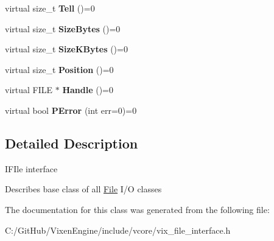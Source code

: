 \begin{DoxyCompactItemize}
\item 
\hypertarget{class_vixen_1_1_i_file_a473b1cfa328219a5f85d745fe7f33ebd}{}virtual size\+\_\+t {\bfseries Tell} ()=0\label{class_vixen_1_1_i_file_a473b1cfa328219a5f85d745fe7f33ebd}

\item 
\hypertarget{class_vixen_1_1_i_file_ade8c8d3e40bebf52130c23a0bace4db8}{}virtual size\+\_\+t {\bfseries Size\+Bytes} ()=0\label{class_vixen_1_1_i_file_ade8c8d3e40bebf52130c23a0bace4db8}

\item 
\hypertarget{class_vixen_1_1_i_file_aafcb6f019831af8743e5a28fb2753126}{}virtual size\+\_\+t {\bfseries Size\+K\+Bytes} ()=0\label{class_vixen_1_1_i_file_aafcb6f019831af8743e5a28fb2753126}

\item 
\hypertarget{class_vixen_1_1_i_file_a1ca999110df6a5a71bb07f374df5f722}{}virtual size\+\_\+t {\bfseries Position} ()=0\label{class_vixen_1_1_i_file_a1ca999110df6a5a71bb07f374df5f722}

\item 
\hypertarget{class_vixen_1_1_i_file_a94e965cd24ea950f98f269317df6f010}{}virtual F\+I\+L\+E $\ast$ {\bfseries Handle} ()=0\label{class_vixen_1_1_i_file_a94e965cd24ea950f98f269317df6f010}

\item 
\hypertarget{class_vixen_1_1_i_file_aec62be3125fd105bdf059e15b4cd4603}{}virtual bool {\bfseries P\+Error} (int err=0)=0\label{class_vixen_1_1_i_file_aec62be3125fd105bdf059e15b4cd4603}

\end{DoxyCompactItemize}


\subsection{Detailed Description}
I\+F\+Ile interface

Describes base class of all \hyperlink{class_vixen_1_1_file}{File} I/\+O classes 

The documentation for this class was generated from the following file\+:\begin{DoxyCompactItemize}
\item 
C\+:/\+Git\+Hub/\+Vixen\+Engine/include/vcore/vix\+\_\+file\+\_\+interface.\+h\end{DoxyCompactItemize}
